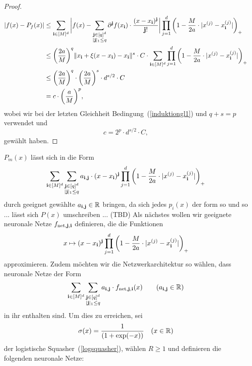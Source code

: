 \begin{proof}
\begin{equation*}
\begin{split}
|f(x) - P_f(x)| & \leq \sum_{\mathbf{i} \in [M]^d} \bigg|f(x) - \sum_{\substack{\mathbf{j} \in [q]^d \\|\mathbf{j}|_1 \leq q}} \partial^{\mathbf{j}}f(x_{\mathbf{i}}) \cdot \frac{(x - x_{\mathbf{i}})^{\mathbf{j}}}{\mathbf{j}!}\bigg| \prod_{j = 1}^d \bigg(1 - \frac{M}{2a} \cdot |x^{(j)} - x_{\mathbf{i}}^{(j)}|\bigg)_+ \\
& \leq \bigg(\frac{2a}{M}\bigg)^q \|x_{\mathbf{i}} + \xi(x - x_{\mathbf{i}}) - x_{\mathbf{i}} \|^s \cdot C \cdot \sum_{\mathbf{i} \in [M]^d} \prod_{j = 1}^d \bigg(1 - \frac{M}{2a} \cdot |x^{(j)} - x_{\mathbf{i}}^{(j)}|\bigg)_+ \\
& \leq \bigg(\frac{2a}{M}\bigg)^q \cdot \bigg(\frac{2a}{M}\bigg)^s \cdot d^{s/2} \cdot C\\
& = c \cdot \bigg(\frac{a}{M}\bigg)^p,
\end{split}
\end{equation*}
wobei wir bei der letzten Gleichheit Bedingung~(\ref{induktiongl1}) und $q + s = p$ verwendet und 
$$c = 2^p \cdot d^{s/2} \cdot C,$$
gewählt haben.
\end{proof}

$P_m(x)$ lässt sich in die Form 
$$\sum_{\mathbf{i} \in [M]^d} \sum_{\substack{ \mathbf{j} \in [q]^d\\|\mathbf{j}|_1 \leq q}} a_{\mathbf{i}, \mathbf{j}} \cdot (x - x_{\mathbf{i}})^{\mathbf{j}} \prod_{j = 1}^d \bigg(1 - \frac{M}{2a} \cdot |x^{(j)} - x_{\mathbf{i}}^{(j)}|\bigg)_+$$
durch geeignet gewählte $a_{\mathbf{i}, \mathbf{j}} \in \mathbb{R}$ bringen, da sich jedes $p_i(x)$ der form so und so ... lässt sich $P(x)$ umschreiben ... (TBD)
Als nächstes wollen wir geeignete neuronale Netze $f_{\mathrm{net}, \mathbf{j}, \mathbf{i}}$ definieren, die die Funktionen
$$x \mapsto (x - x_{\mathbf{i}})^{\mathbf{j}} \prod_{j = 1}^d \bigg(1 - \frac{M}{2a} \cdot |x^{(j)} - x_{\mathbf{i}}^{(j)}|\bigg)_+$$ approximieren. Zudem möchten wir die Netzwerkarchitektur so wählen, dass neuronale Netze der Form
$$\sum_{\mathbf{i} \in [M]^d} \sum_{\substack{ \mathbf{j} \in [q]^d\\|\mathbf{j}|_1 \leq q}} a_{\mathbf{i}, \mathbf{j}} \cdot f_{\mathrm{net},\mathbf{j},\mathbf{i}}(x) \qquad (a_{\mathbf{i},\mathbf{j}} \in \mathbb{R})$$ in ihr enthalten sind.
Um dies zu erreichen, sei $$\sigma(x) = \frac{1}{(1 + \exp(-x))} \quad (x \in \mathbb{R})$$ der logistische Squasher~(\ref{logsquasher}), wählen $R \geq 1$ und definieren die folgenden neuronale Netze:


